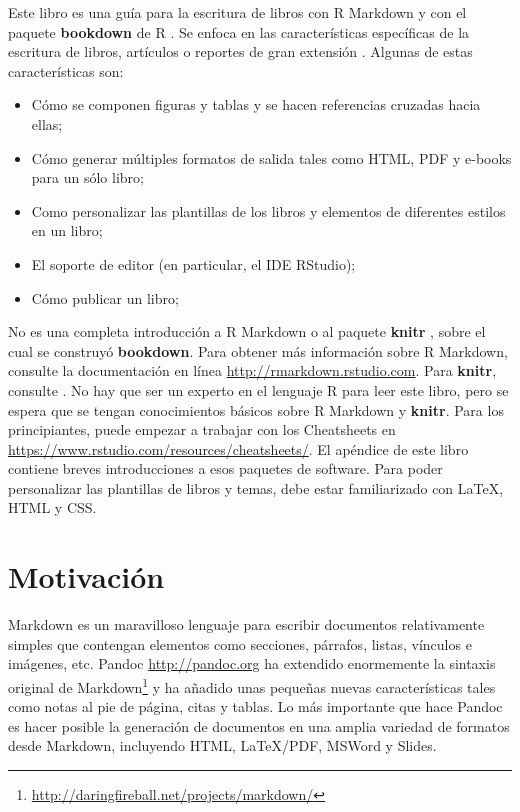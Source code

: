 \documentclass[12pt,]{krantz}
\renewcommand{\href}[2]{#2\footnote{\url{#1}}}
\theoremstyle{definition}
\theoremstyle{definition}
\theoremstyle{definition}
\theoremstyle{remark}
\begin{document}
Este libro es una guía para la escritura de libros con R Markdown
\citep{R-rmarkdown} y con el paquete \textbf{bookdown} de R
\citep{R-bookdown}. Se enfoca en las características específicas de la
escritura de libros, artículos o reportes de gran extensión . Algunas de
estas características son:

\begin{itemize}
\item
  Cómo se componen figuras y tablas y se hacen referencias cruzadas
  hacia ellas;
\item
  Cómo generar múltiples formatos de salida tales como HTML, PDF y
  e-books para un sólo libro;
\item
  Como personalizar las plantillas de los libros y elementos de
  diferentes estilos en un libro;
\item
  El soporte de editor (en particular, el IDE RStudio);
\item
  Cómo publicar un libro;
\end{itemize}

No es una completa introducción a R Markdown o al paquete \textbf{knitr}
\citep{R-knitr}, sobre el cual se construyó \textbf{bookdown}. Para
obtener más información sobre R Markdown, consulte la documentación en
línea \url{http://rmarkdown.rstudio.com}. Para \textbf{knitr}, consulte
\citet{xie2015}. No hay que ser un experto en el lenguaje R
\citep{R-base} para leer este libro, pero se espera que se tengan
conocimientos básicos sobre R Markdown y \textbf{knitr}. Para los
principiantes, puede empezar a trabajar con los Cheatsheets en
\url{https://www.rstudio.com/resources/cheatsheets/}. El apéndice de
este libro contiene breves introducciones a esos paquetes de software.
Para poder personalizar las plantillas de libros y temas, debe estar
familiarizado con LaTeX, HTML y CSS.

\section{Motivación}\label{motivacion}

Markdown es un maravilloso lenguaje para escribir documentos
relativamente simples que contengan elementos como secciones, párrafos,
listas, vínculos e imágenes, etc. Pandoc \url{http://pandoc.org} ha
extendido enormemente la
\href{http://daringfireball.net/projects/markdown/}{sintaxis original de
Markdown} y ha añadido unas pequeñas nuevas características tales como
notas al pie de página, citas y tablas. Lo más importante que hace
Pandoc es hacer posible la generación de documentos en una amplia
variedad de formatos desde Markdown, incluyendo HTML, LaTeX/PDF, MSWord
y Slides.
\end{document}
